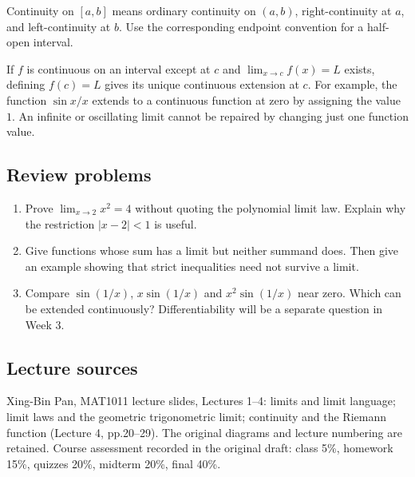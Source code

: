 \documentclass[11pt,a4paper]{article}
\begin{document}
Continuity on \([a,b]\) means ordinary continuity on \((a,b)\),
right-continuity at \(a\), and left-continuity at \(b\). Use the
corresponding endpoint convention for a half-open interval.

If \(f\) is continuous on an interval except at \(c\) and
\(\lim_{x\to c}f(x)=L\) exists, defining \(f(c)=L\) gives its unique
continuous extension at \(c\). For example, the function \(\sin x/x\)
extends to a continuous function at zero by assigning the value \(1\).
An infinite or oscillating limit cannot be repaired by changing just one
function value.

\subsection{Review problems}\label{review-problems}

\begin{enumerate}
\def\labelenumi{\arabic{enumi}.}
\item
  Prove \(\lim_{x\to2}x^2=4\) without quoting the polynomial limit law.
  Explain why the restriction \(|x-2|<1\) is useful.
\item
  Give functions whose sum has a limit but neither summand does. Then
  give an example showing that strict inequalities need not survive a
  limit.
\item
  Compare \(\sin(1/x)\), \(x\sin(1/x)\) and \(x^2\sin(1/x)\) near zero.
  Which can be extended continuously? Differentiability will be a
  separate question in Week 3.
\end{enumerate}

\subsection{Lecture sources}\label{lecture-sources}

Xing-Bin Pan, MAT1011 lecture slides, Lectures 1--4: limits and limit
language; limit laws and the geometric trigonometric limit; continuity
and the Riemann function (Lecture 4, pp.20--29). The original diagrams
and lecture numbering are retained. Course assessment recorded in the
original draft: class 5\%, homework 15\%, quizzes 20\%, midterm 20\%,
final 40\%.
\end{document}
